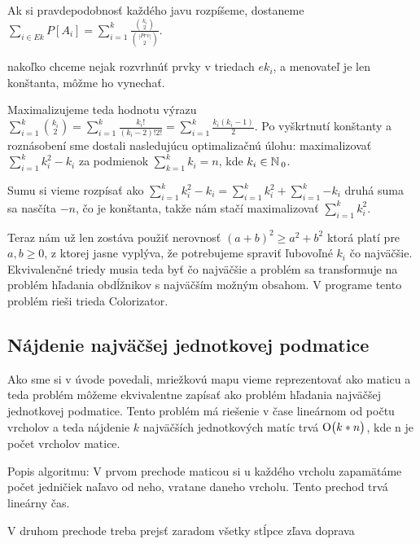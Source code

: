 Ak si pravdepodobnosť každého javu rozpíšeme, dostaneme 
$\sum_{i \in Ek}P[A_i] = \sum_{i = 1}^{k} \frac{{{k_i} \choose {2}}}{{{|Prv|} \choose {2}}}$.


nakoľko chceme nejak rozvrhnúť prvky v triedach $ek_i$, a menovateľ je len
konštanta, môžme ho vynechať.

Maximalizujeme teda hodnotu výrazu 
$\sum_{i = 1}^{k} {{k_i} \choose {2}} = \sum_{i = 1}^{k} {\frac{k_i!}{(k_i -2 )!2!}} = \sum_{i = 1}^{k}{\frac{k_i (k_i-1)}{2}}$.
Po vyškrtnutí konštanty a roznásobení sme dostali nasledujúcu optimalizačnú úlohu:
maximalizovať $\sum_{i = 1}^{k} {k_i^2 - k_i}$ za podmienok $\sum_{k=1}^{k}k_i = n$,
kde $k_i \in \mathbb{N}\,_0$.

Sumu si vieme rozpísať ako 
$\sum_{i = 1}^{k} {k_i^2 - k_i} = \sum_{i = 1}^{k} {k_i^2} + \sum_{i = 1}^{k}{-k_i}$
druhá suma sa nasčíta $-n$, čo je konštanta, takže nám stačí maximalizovať 
$\sum_{i = 1}^{k} {k_i^2}$.

Teraz nám už len zostáva použiť nerovnosť
$(a+b)^2 \geq a^2 + b^2$ ktorá platí pre $a,b \geq 0$, z ktorej jasne vyplýva, že potrebujeme spraviť ľubovoľné $k_i$ čo najväčšie.
Ekvivalenčné triedy musia teda byť čo najväčšie a problém sa transformuje na problém hľadania
obdĺžnikov s najväčším možným obsahom.
V programe tento problém rieši trieda Colorizator.


\subsection{Nájdenie najväčšej jednotkovej podmatice}
Ako sme si v úvode povedali, mriežkovú mapu vieme reprezentovať ako maticu a teda
problém môžeme ekvivalentne zapísať ako problém hľadania najväčšej jednotkovej podmatice.
Tento problém má riešenie v čase lineárnom od počtu vrcholov a teda nájdenie $k$ najväčších
jednotkových matíc trvá $\operatorname{O}\bigl(k*n\bigr)$, kde n je počet vrcholov matice.

Popis algoritmu: 
V prvom prechode maticou si u každého vrcholu zapamätáme počet jedničiek naľavo od neho, vratane daneho vrcholu. 
Tento prechod trvá lineárny čas.

V druhom prechode treba prejsť zaradom všetky stĺpce zľava doprava